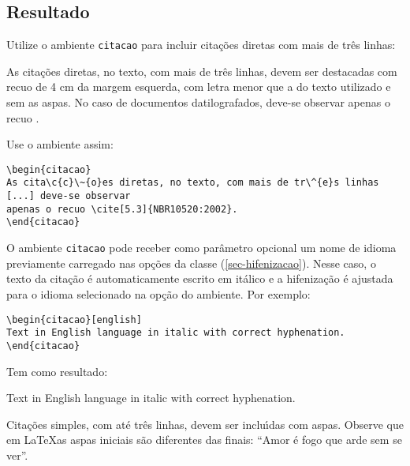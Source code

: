 \subsection{Resultado}


Utilize o ambiente \texttt{citacao} para incluir
cita\c{c}\~{o}es diretas com mais de tr\^{e}s linhas:

\begin{citacao}
As cita\c{c}\~{o}es diretas, no texto, com mais de tr\^{e}s linhas, devem ser
destacadas com recuo de 4 cm da margem esquerda, com letra menor que a do texto
utilizado e sem as aspas. No caso de documentos datilografados, deve-se
observar apenas o recuo \cite[5.3]{NBR10520:2002}.
\end{citacao}

Use o ambiente assim:

\begin{verbatim}
\begin{citacao}
As cita\c{c}\~{o}es diretas, no texto, com mais de tr\^{e}s linhas [...] deve-se observar
apenas o recuo \cite[5.3]{NBR10520:2002}.
\end{citacao}
\end{verbatim}

O ambiente \texttt{citacao} pode receber como par\^{a}metro opcional um nome de
idioma previamente carregado nas op\c{c}\~{o}es da classe (\autoref{sec-hifenizacao}). Nesse
caso, o texto da cita\c{c}\~{a}o \'{e} automaticamente escrito em it\'{a}lico e a hifeniza\c{c}\~{a}o \'{e}
ajustada para o idioma selecionado na op\c{c}\~{a}o do ambiente. Por exemplo:

\begin{verbatim}
\begin{citacao}[english]
Text in English language in italic with correct hyphenation.
\end{citacao}
\end{verbatim}

Tem como resultado:

\begin{citacao}[english]
Text in English language in italic with correct hyphenation.
\end{citacao}

Cita\c{c}\~{o}es simples, com at\'{e} tr\^{e}s linhas, devem ser
inclu\'{\i}das com aspas. Observe que em \LaTeX as aspas iniciais s\~{a}o diferentes das
finais: ``Amor \'{e} fogo que arde sem se ver''.

